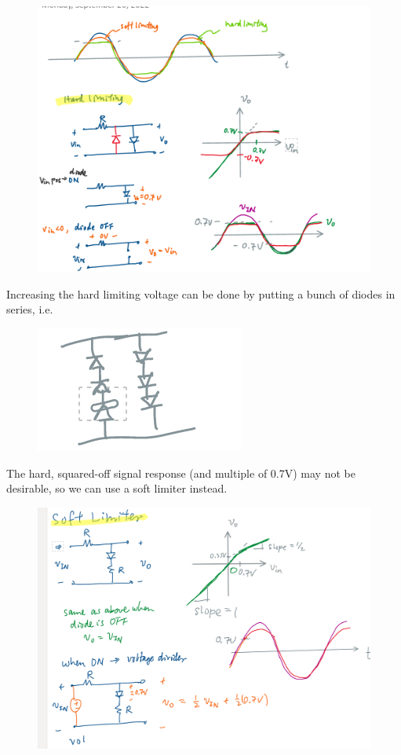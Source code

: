 \documentclass[../notes.tex]{subfiles}
\begin{document}
\begin{figure}[H]
	\centering
	\includegraphics[width=0.8\linewidth]{img/image_2022-09-26-12-35-18.png}
\end{figure}
Increasing the hard limiting voltage can be done by putting a bunch of diodes in series, i.e.
\begin{figure}[H]
	\centering
	\includegraphics[width=0.8\linewidth]{img/image_2022-09-26-12-36-31.png}
\end{figure}


The hard, squared-off signal response (and multiple of 0.7V) may not be desirable, so we can use a soft limiter instead.


\begin{figure}[H]
	\centering
	\includegraphics[width=0.8\linewidth]{img/image_2022-09-26-12-37-25.png}
\end{figure}
\end{document}

